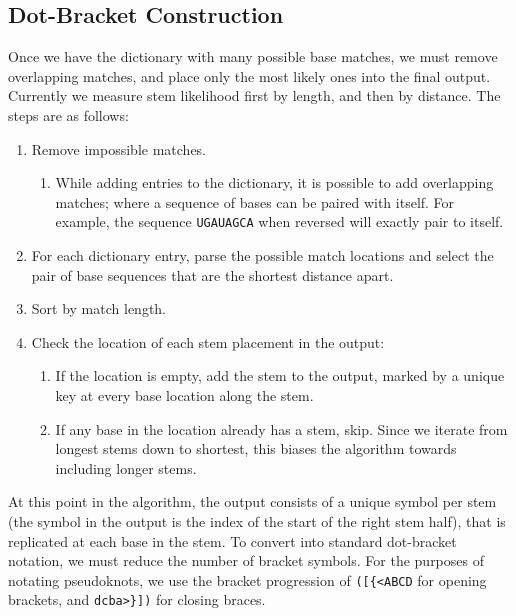 \documentclass[sigconf]{acmart}
\begin{document}
\subsection{Dot-Bracket Construction}
Once we have the dictionary with many possible base matches, we must remove overlapping matches, and place only the most likely ones into the final output. Currently we measure stem likelihood first by length, and then by distance. The steps are as follows:
\begin{enumerate}
\item Remove impossible matches.
	\begin{enumerate}
	\item While adding entries to the dictionary, it is possible to add overlapping matches; where a sequence of bases can be paired with itself. For example, the sequence \texttt{UGAUAGCA} when reversed will exactly pair to itself. 
	\end{enumerate}
\item For each dictionary entry, parse the possible match locations and select the pair of base sequences that are the shortest distance apart.
\item Sort by match length.
\item Check the location of each stem placement in the output:
	\begin{enumerate}
	\item If the location is empty, add the stem to the output, marked by a unique key at every base location along the stem.
	\item If any base in the location already has a stem, skip. Since we iterate from longest stems down to shortest, this biases the algorithm towards including longer stems.
	\end{enumerate}
\end{enumerate}


At this point in the algorithm, the output consists of a unique symbol per stem (the symbol in the output is the index of the start of the right stem half), that is replicated at each base in the stem. To convert into standard dot-bracket notation, we must reduce the number of bracket symbols. For the purposes of notating pseudoknots, we use the bracket progression of \verb|([{<ABCD| for opening brackets, and \verb|dcba>}])| for closing braces.
\end{document}
